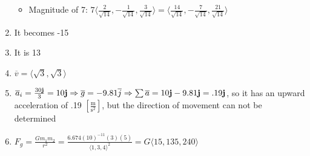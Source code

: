 \begin{enumerate}
\begin{itemize}
      \item Magnitude of 7: $7\langle \frac{2}{\sqrt{14}}, -\frac{1}{\sqrt{14}}, \frac{3}{\sqrt{14}} \rangle = \langle \frac{14}{\sqrt{14}}, -\frac{7}{\sqrt{14}}, \frac{21}{\sqrt{14}} \rangle$

    \end{itemize}

    \setcounter{enumi}{40}

  \item It becomes -15

  \item It is 13

  \item $\overline{v}=\langle \sqrt{3}, \sqrt{3} \rangle$

    \setcounter{enumi}{44}

  \item $\overline{a}_i = \frac{30\bold{j}}{3} = 10\bold{j} \Rightarrow \overline{g} = -9.81\overline{j} \Rightarrow \sum \overline{a} = 10\bold{j} - 9.81\bold{j} = .19\bold{j}$, so it has an upward acceleration of .19 $\left[ \frac{\si{\meter}}{\si{\second\squared}} \right]$, but the direction of movement can not be determined

  \item $F_g = \frac{Gm_1m_2}{r^2} = \frac{6.674(10)^{-11}(3)(5)}{\langle 1, 3, 4 \rangle^2} = G\langle 15, 135, 240 \rangle$

\end{enumerate}



